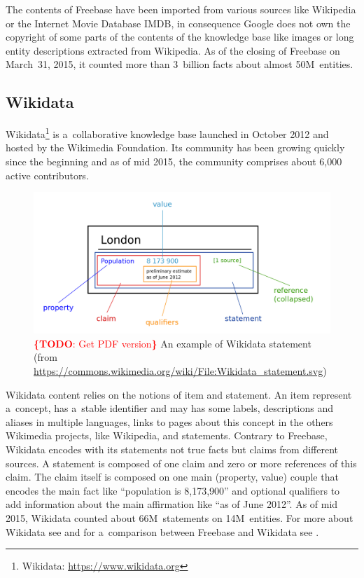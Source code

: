 \documentclass{sig-alternate}
\newcommand{\todo}[1]{\noindent\textcolor{red}{{\bf \{TODO}: #1{\bf \}}}}
\begin{document}
The contents of Freebase have been imported from various sources like Wikipedia
or the Internet Movie Database IMDB,
in consequence Google does not own the copyright of some parts of the contents of the knowledge base
like images or long entity descriptions extracted from Wikipedia.
As of the closing of Freebase on March~31, 2015,
it counted more than 3~billion facts about almost 50M~entities.

\subsection{Wikidata}

Wikidata\footnote{Wikidata: \url{https://www.wikidata.org}}
is a~collaborative knowledge base
launched in October 2012 and hosted by the Wikimedia Foundation.
Its community has been growing quickly since the beginning and as of mid 2015,
the community comprises about 6,000 active contributors.

\begin{figure}[!htbp]
\centering
\includegraphics[width=8.45 cm]{img/Wikidata-statement.png}
\caption{\todo{Get PDF version} An example of Wikidata statement (from
	\url{https://commons.wikimedia.org/wiki/File:Wikidata_statement.svg})}
\label{fig-statement}
\end{figure}

Wikidata content relies on the notions of item and statement.
An item represent a~concept, has a~stable identifier and may has some labels,
descriptions and aliases in multiple languages, links to pages about this concept
in the others Wikimedia projects, like Wikipedia, and statements.
Contrary to Freebase, Wikidata encodes with its statements not true facts
but claims from different sources.
A statement is composed of one claim and zero or more references of this claim.
The claim itself is composed on one main (property, value) couple that encodes
the main fact like ``population is 8,173,900'' and optional qualifiers
to add information about the main affirmation like ``as of June 2012''.
As of mid 2015, Wikidata counted about 66M~statements on 14M~entities.
For more about Wikidata see \cite{vrandevcic2014wikidata}
and for a~comparison between Freebase and Wikidata see \cite{farbercomparative}.
\end{document}
